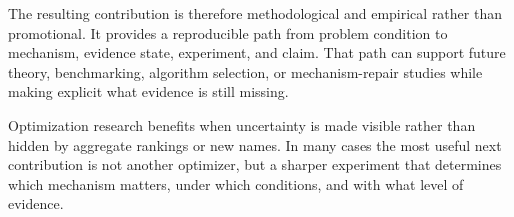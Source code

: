 The resulting contribution is therefore methodological and empirical rather than promotional. It provides a reproducible path from problem condition to mechanism, evidence state, experiment, and claim. That path can support future theory, benchmarking, algorithm selection, or mechanism-repair studies while making explicit what evidence is still missing.

Optimization research benefits when uncertainty is made visible rather than hidden by aggregate rankings or new names. In many cases the most useful next contribution is not another optimizer, but a sharper experiment that determines which mechanism matters, under which conditions, and with what level of evidence.
